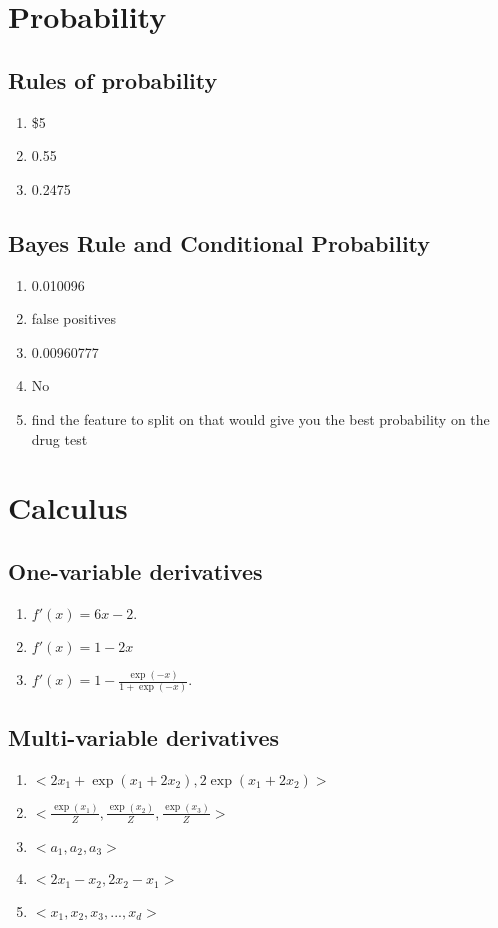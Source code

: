 \documentclass[letterpaper,12pt]{article}
\begin{document}
    \section{Probability}
    \subsection{Rules of probability}
    \begin{enumerate}
        \item \$5
        \item 0.55
        \item 0.2475
    \end{enumerate}
    \subsection{Bayes Rule and Conditional Probability}
    \begin{enumerate}
    \item 0.010096
    \item false positives
    \item 0.00960777
    \item No 
    \item find the feature to split on that would give you the best probability on the drug test
    \end{enumerate}
    
    \section{Calculus}
    \subsection{One-variable derivatives}
    \begin{enumerate}
    \item $f'(x) = 6x - 2.$
    \item $f'(x) = 1-2x$
    \item $f'(x) = 1-\frac{\exp(-x)}{1 + \exp(-x)}.$
    \end{enumerate}

    \subsection{Multi-variable derivatives}
    \begin{enumerate}
    \item $<2x_1 + \exp(x_1 + 2x_2), 2\exp(x_1 + 2x_2) >$
    \item $<\frac{\exp(x_1)}{Z}, \frac{\exp(x_2)}{Z}, \frac{\exp(x_3)}{Z} >$
    \item $<a_1, a_2, a_3>$
    \item $<2x_1 - x_2, 2x_2 - x_1>$
    \item $<x_1, x_2, x_3, ... , x_d>$
    \end{enumerate}
    
\end{document}
